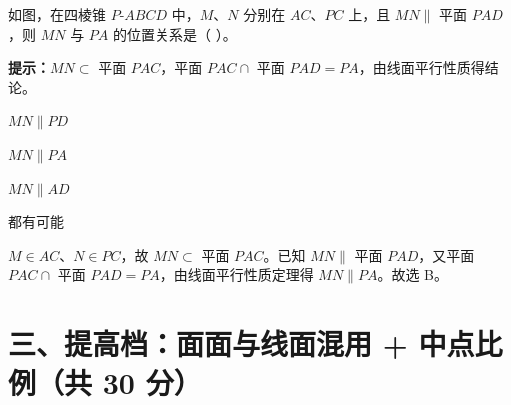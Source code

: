 \documentclass{exam-zh}
\begin{document}
\begin{question}[points=10]
  \noindent
  \begin{minipage}[t]{\dimexpr\linewidth-60mm-6mm\relax}
    \vspace{0pt}
    如图，在四棱锥 $P$-$ABCD$ 中，$M$、$N$ 分别在 $AC$、$PC$ 上，且 $MN\parallel$ 平面 $PAD$，则 $MN$ 与 $PA$ 的位置关系是（    ）。
    \begin{hintbox}
\textbf{提示：}$MN\subset$ 平面 $PAC$，平面 $PAC\cap$ 平面 $PAD=PA$，由线面平行性质得结论。\end{hintbox}

    \par
    \begin{choices}[columns=1]
      \item $MN\parallel PD$
      \item $MN\parallel PA$
      \item $MN\parallel AD$
      \item 都有可能
    \end{choices}
  \end{minipage}\hfill
  \begin{diagramcoltikz}{60mm}{找到含 $MN$ 的辅助面与平面 $PAD$ 的交线。}
  }
  \end{diagramcoltikz}
  \paren[B]
  \begin{solutionblock}
    $M\in AC$、$N\in PC$，故 $MN\subset$ 平面 $PAC$。已知 $MN\parallel$ 平面 $PAD$，又平面 $PAC\cap$ 平面 $PAD=PA$，由线面平行性质定理得 $MN\parallel PA$。故选 B。
  \end{solutionblock}
\end{question}



\clearpage
\section*{三、提高档：面面与线面混用 + 中点比例（共 30 分）}

\end{document}
